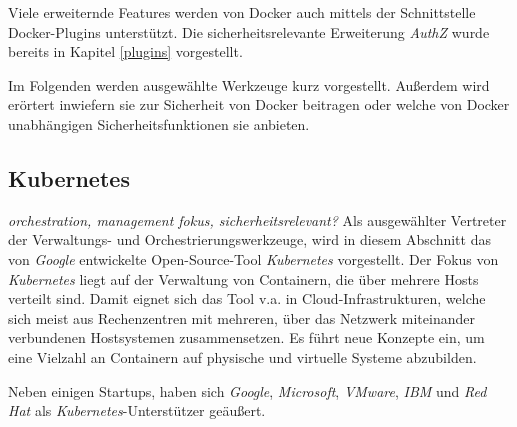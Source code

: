 \documentclass[../main.tex]{subfiles}
\begin{document}
    Viele erweiternde Features werden von Docker auch mittels der Schnittstelle Docker-Plugins unterstützt. Die sicherheitsrelevante Erweiterung \emph{AuthZ} wurde bereits in Kapitel \ref{plugins} vorgestellt.

    Im Folgenden werden ausgewählte Werkzeuge kurz vorgestellt. Außerdem wird erörtert inwiefern sie zur Sicherheit von Docker beitragen oder welche von Docker unabhängigen Sicherheitsfunktionen sie anbieten.



    \subsection{Kubernetes}
      \emph{orchestration, management fokus, sicherheitsrelevant?}
      Als ausgewählter Vertreter der Verwaltungs- und Orchestrierungswerkzeuge, wird in diesem Abschnitt das von \emph{Google} entwickelte Open-Source-Tool \emph{Kubernetes} vorgestellt. Der Fokus von \emph{Kubernetes} liegt auf der Verwaltung von Containern, die über mehrere Hosts verteilt sind. Damit eignet sich das Tool v.a. in Cloud-Infrastrukturen, welche sich meist aus Rechenzentren mit mehreren, über das Netzwerk miteinander verbundenen Hostsystemen zusammensetzen. Es führt neue Konzepte ein, um eine Vielzahl an Containern auf physische und virtuelle Systeme abzubilden.

      Neben einigen Startups, haben sich \emph{Google}, \emph{Microsoft}, \emph{VMware}, \emph{IBM} und \emph{Red Hat} als \emph{Kubernetes}-Unterstützer geäußert.
\end{document}

